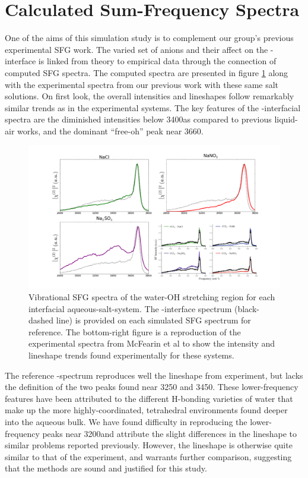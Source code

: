 \section{Calculated Sum-Frequency Spectra}

One of the aims of this simulation study is to complement our group's previous experimental SFG work.\cite{McFearin2009} The varied set of anions and their affect on the \ctc-\wat interface is linked from theory to empirical data through the connection of computed SFG spectra. The computed spectra are presented in figure \ref{fig:sfg-spectra} along with the experimental spectra from our previous work with these same salt solutions.\cite{McFearin2009} On first look, the overall intensities and lineshapes follow remarkably similar trends as in the experimental systems. The key features of the \ctc-\wat interfacial spectra are the diminished intensities below 3400\cm as compared to previous liquid-air works, and the dominant ``free-oh'' peak near 3660\cm.

\begin{figure}[h!]
\begin{center}
	\includegraphics[scale=1.0]{images/sfg-spectra.png}
	\caption{Vibrational SFG spectra of the water-OH stretching region for each interfacial aqueous-salt-\ctc system. The \ctc-\wat interface spectrum (black-dashed line) is provided on each simulated SFG spectrum for reference. The bottom-right figure is a reproduction of the experimental spectra from McFearin et al to show the intensity and lineshape trends found experimentally for these systems.\cite{McFearin2009}}
	\label{fig:sfg-spectra}
\end{center}
\end{figure}

The reference \ctc-\wat spectrum reproduces well the lineshape from experiment, but lacks the definition of the two peaks found near 3250 and 3450\cm. These lower-frequency features have been attributed to the different H-bonding varieties of water that make up the more highly-coordinated, tetrahedral environments found deeper into the aqueous bulk. We have found difficulty in reproducing the lower-frequency peaks near 3200\cm and attribute the slight differences in the lineshape to similar problems reported previously.\cite{Walker2006b} However, the lineshape is otherwise quite similar to that of the experiment, and warrants further comparison, suggesting that the methods are sound and justified for this study.

